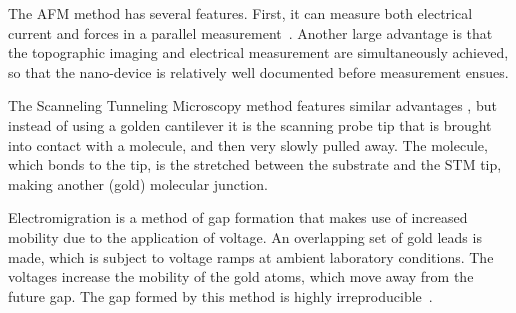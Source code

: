 The AFM method has several features. First, it can measure both electrical current and forces in a parallel measurement~\cite{nef}. Another large advantage is that the topographic imaging and electrical measurement are simultaneously achieved, so that the nano-device is relatively well documented before measurement ensues.

The Scanneling Tunneling Microscopy method features similar advantages \cite{Joachim2000}, but instead of using a golden cantilever it is the scanning probe tip that is brought into contact with a molecule, and then very slowly pulled away. The molecule, which bonds to the tip, is the stretched between the substrate and the STM tip, making another (gold) molecular junction.

Electromigration is a method of gap formation that makes use of increased mobility due to the application of voltage. An overlapping set of gold leads is made, which is subject to voltage ramps at ambient laboratory conditions. The voltages increase the mobility of the gold atoms, which move away from the future gap. The gap formed by this method is highly irreproducible~\cite{electromigration}.

